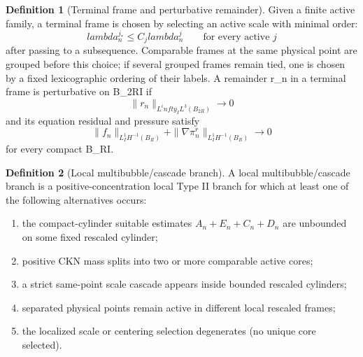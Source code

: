 \documentclass[11pt]{amsart}
\def\({}%
\def\){}%
\def\lambda{lambda}%
\def\infty{infty}%
\theoremstyle{plain}
\theoremstyle{definition}
\newtheorem{definition}[definition]{Definition}
\theoremstyle{remark}
\begin{document}
\begin{definition}[Terminal frame and perturbative remainder]\label{paper3:def:terminal-frame}
Given a finite active family, a terminal frame is chosen by selecting an active
scale with minimal order:
\[
  \lambda^{j_*}_n\le C_j\lambda^j_n
  \qquad\text{for every active }j
\]
after passing to a subsequence.  Comparable frames at the same physical point
are grouped before this choice; if several grouped frames remain tied, one is
chosen by a fixed lexicographic ordering of their labels.  A remainder \(r_n\)
in a terminal frame is perturbative on \(B_{2R}\times I\) if
\[
  \|r_n\|_{L^\infty_I L^3(B_{2R})}\to0
\]
and its equation residual and pressure satisfy
\[
  \|f_n\|_{L^1_IH^{-1}(B_R)}+\|\nabla\pi^r_n\|_{L^1_IH^{-1}(B_R)}\to0
\]
for every compact \(B_R\times I\).
\end{definition}

\begin{definition}[Local multibubble/cascade branch]\label{paper3:def:local-multibubble}
A local multibubble/cascade branch is a positive-concentration local Type II
branch for which at least one of the following alternatives occurs:
\begin{enumerate}[label=\textup{(\roman*)}]
\item the compact-cylinder suitable estimates $A_n+E_n+C_n+D_n$ are unbounded on some
  fixed rescaled cylinder;
\item positive CKN mass splits into two or more comparable active cores;
\item a strict same-point scale cascade appears inside bounded rescaled cylinders;
\item separated physical points remain active in different local rescaled frames;
\item the localized scale or centering selection degenerates (no unique core
  selected).
\end{enumerate}
\end{definition}
\end{document}
